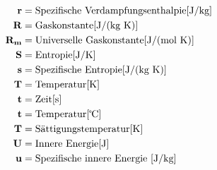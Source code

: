 \documentclass[twocolumn]{article}
\begin{document}
\begin{align*}
	\mathbf{r}		&=	\text{Spezifische Verdampfungsenthalpie[J/kg]} \\
	\mathbf{R}		&=	\text{Gaskonstante[J/(kg K)]} \\
	\mathbf{R_m}		&=	\text{Universelle Gaskonstante[J/(mol K)]} \\
	\mathbf{S}		&=	\text{Entropie[J/K]} \\
	\mathbf{s}		&=	\text{Spezifische Entropie[J/(kg K)]} \\
	\mathbf{T}		&=	\text{Temperatur[K]} \\
	\mathbf{t}		&=	\text{Zeit[s]} \\
	\mathbf{t}		&=	\text{Temperatur[\textcelsius{}]} \\
	\mathbf{T}		&=	\text{Sättigungstemperatur[K]} \\
	\mathbf{U}		&=	\text{Innere Energie[J]} \\
	\mathbf{u}		&=	\text{Spezifische innere Energie [J/kg]} \\
\end{align*}
\\\\\\\\
\bigskip
\end{document}

